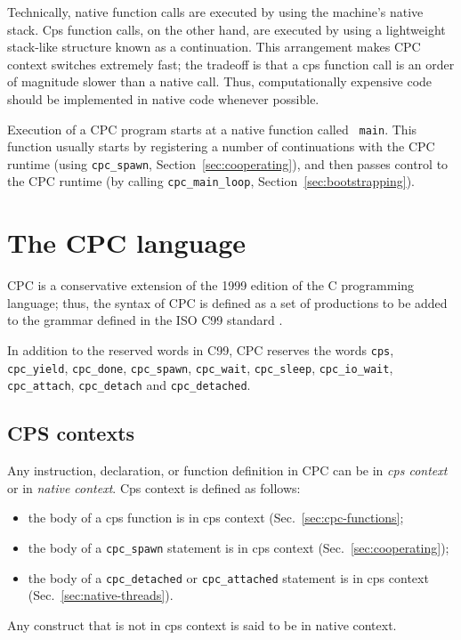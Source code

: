 \documentclass[a4paper]{report}
\begin{document}
Technically, native function calls are executed by using the machine's
native stack.  Cps function calls, on the other hand, are executed by
using a lightweight stack-like structure known as a continuation.
This arrangement makes CPC context switches extremely fast; the
tradeoff is that a cps function call is an order of magnitude slower
than a native call.  Thus, computationally expensive code should be
implemented in native code whenever possible.

Execution of a CPC program starts at a native function called {\tt
  main}.  This function usually starts by registering a number of
continuations with the CPC runtime (using {\tt cpc\_spawn},
Section~\ref{sec:cooperating}), and then passes control to the CPC
runtime (by calling {\tt cpc\_main\_loop}, Section~\ref{sec:bootstrapping}).

\section{The CPC language}

CPC is a conservative extension of the 1999 edition of the C programming
language; thus, the syntax of CPC is defined as a set of productions to be
added to the grammar defined in the ISO C99 standard \cite{iso:c99}.

In addition to the reserved words in C99, CPC reserves the words
{\tt cps}, {\tt cpc\_yield}, {\tt cpc\_done}, {\tt cpc\_spawn}, 
{\tt cpc\_wait}, {\tt cpc\_sleep},
{\tt cpc\_io\_wait}, {\tt cpc\_attach}, {\tt cpc\_detach} and
{\tt cpc\_detached}.

\subsection{CPS contexts} \label{sec:contexts}

Any instruction, declaration, or function definition in CPC can be in
{\em cps context\/} or in {\em native context}.  Cps context is
defined as follows:
\begin{itemize}
\item the body of a cps function is in cps context
  (Sec.~\ref{sec:cpc-functions};
\item the body of a {\tt cpc\_spawn} statement is in cps context
  (Sec.~\ref{sec:cooperating});
\item the body of a {\tt cpc\_detached} or {\tt cpc\_attached} statement is
  in cps context (Sec.~\ref{sec:native-threads}).
\end{itemize}
Any construct that is not in cps context is said to be in native context.
\end{document}
